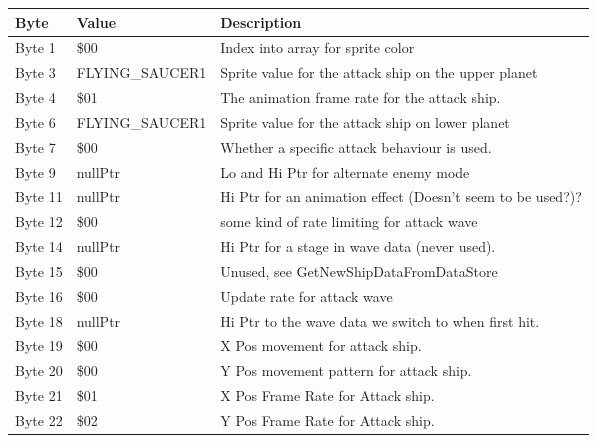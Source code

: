 \begin{figure}[H]
{\begin{adjustbox}{width=12cm}
\begin{tabular}{lll}
\toprule
 Byte    & Value                      & Description                                                        \\
\midrule
 Byte 1  & \$00                        & Index into array for sprite color                                  \\
 Byte 3  & FLYING\_SAUCER1             & Sprite value for the attack ship on the upper planet               \\
 Byte 4  & \$01                        & The animation frame rate for the attack ship.                      \\
 Byte 6  & FLYING\_SAUCER1             & Sprite value for the attack ship on lower planet                   \\
 Byte 7  & \$00                        & Whether a specific attack behaviour is used.                       \\
 Byte 9  & nullPtr                    & Lo and Hi Ptr for alternate enemy mode                             \\
 Byte 11 & nullPtr                    & Hi Ptr for an animation effect (Doesn't seem to be used?)?         \\
 Byte 12 & \$00                        & some kind of rate limiting for attack wave                         \\
 Byte 14 & nullPtr                    & Hi Ptr for a stage in wave data (never used).                      \\
 Byte 15 & \$00                        & Unused, see GetNewShipDataFromDataStore                            \\
 Byte 16 & \$00                        & Update rate for attack wave                                        \\
 Byte 18 & nullPtr                    & Hi Ptr to the wave data we switch to when first hit.               \\
 Byte 19 & \$00                        & X Pos movement for attack ship.                                    \\
 Byte 20 & \$00                        & Y Pos movement pattern for attack ship.                            \\
 Byte 21 & \$01                        & X Pos Frame Rate for Attack ship.                                  \\
 Byte 22 & \$02                        & Y Pos Frame Rate for Attack ship.                                  \\

\end{tabular}
\end{adjustbox}}
\end{figure}
